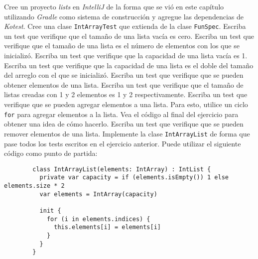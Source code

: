 \begin{Exercise}[title={Listas}]
    \Question Cree un proyecto \textit{lists} en \textit{IntelliJ} de la forma que se vió en 
      este capítulo utilizando \textit{Gradle} como sistema de construcción y agregue las 
      dependencias de \textit{Kotest}.
    \Question Cree una clase \texttt{IntArrayTest} que extienda de la clase \texttt{FunSpec}.
    \Question Escriba un test que verifique que el tamaño de una lista vacía es cero.
    \Question Escriba un test que verifique que el tamaño de una lista es el número de elementos
      con los que se inicializó.
    \Question Escriba un test que verifique que la capacidad de una lista vacía es 1.
    \Question Escriba un test que verifique que la capacidad de una lista es el doble del tamaño del
      arreglo con el que se inicializó.
    \Question Escriba un test que verifique que se pueden obtener elementos de una lista.
    \Question Escriba un test que verifique que el tamaño de listas creadas con 1 y 2 elementos
      es 1 y 2 respectivamente.
    \Question Escriba un test que verifique que se pueden agregar elementos a una lista.
      Para esto, utilice un ciclo \texttt{for} para agregar elementos a la lista.
      Vea el código al final del ejercicio para obtener una idea de cómo hacerlo.
    \Question Escriba un test que verifique que se pueden remover elementos de una lista.
    \Question Implemente la clase \texttt{IntArrayList} de forma que pase todos los tests
      escritos en el ejercicio anterior.
      Puede utilizar el siguiente código como punto de partida:
      \begin{verbatim}
        class IntArrayList(elements: IntArray) : IntList {
          private var capacity = if (elements.isEmpty()) 1 else elements.size * 2
          var elements = IntArray(capacity)

          init {
            for (i in elements.indices) {
              this.elements[i] = elements[i]
            }
          }
        }
      \end{verbatim}


\end{Exercise}
